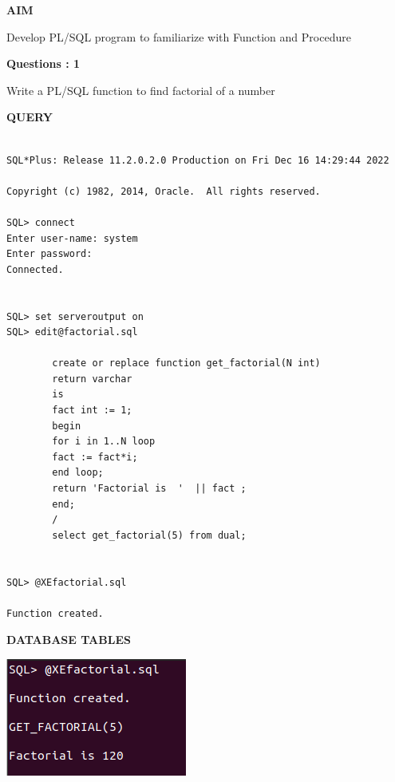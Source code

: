 \documentclass[a4paper,12pt]{report}
\begin{document}
	\begin{flushleft}
		\textbf{AIM }
	\end{flushleft} 
	   Develop PL/SQL program to familiarize with Function and Procedure

\begin{flushleft}
    \textbf{Questions : 1}
\end{flushleft}
Write a PL/SQL function to find factorial of a number
	\begin{flushleft}
		\textbf{QUERY }
	\end{flushleft}
 \begin{verbatim}
 
SQL*Plus: Release 11.2.0.2.0 Production on Fri Dec 16 14:29:44 2022

Copyright (c) 1982, 2014, Oracle.  All rights reserved.

SQL> connect
Enter user-name: system
Enter password:
Connected.


SQL> set serveroutput on
SQL> edit@factorial.sql

		create or replace function get_factorial(N int)
		return varchar
		is
		fact int := 1;
		begin
		for i in 1..N loop
		fact := fact*i;
		end loop;
		return 'Factorial is  '  || fact ;
		end;
		/
		select get_factorial(5) from dual;


SQL> @XEfactorial.sql

Function created.

\end{verbatim}
\begin{flushleft}
		\textbf{DATABASE TABLES} 
\end{flushleft} 

\includegraphics[scale=0.7]{FACTORIAL.png}
\end{document}
